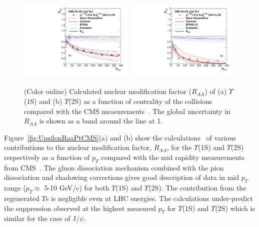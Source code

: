 {\begin{figure}
\includegraphics[width=0.49\textwidth]{Figures/Fig20l_CMS_Y1SRAANPart_Shade.pdf}
\includegraphics[width=0.49\textwidth]{Figures/Fig20r_CMS_Y2SRAANPart_Shade.pdf}
\caption{(Color online) Calculated nuclear modification factor ($R_{AA}$) \cite{Kumar:2019xdj} of 
  (a) $\Upsilon$(1S) and (b) $\Upsilon$(2S) as a function of centrality of the 
  collisions compared with the CMS measurements~\cite{Sirunyan:2018nsz}.%
  The global uncertainty in $R_{AA}$ is shown as a band around the line at 1.
}
\label{fig:UpsilonRaaNPartCMS}
\end{figure}


Figure~\ref{fig:UpsilonRaaPtCMS}(a) and (b) show the calculations~\cite{Kumar:2019xdj}
of various contributions to
the nuclear modification factor, $R_{AA}$, for the $\Upsilon$(1S) and $\Upsilon$(2S)
respectively as a function of $p_T$ compared with the mid rapidity measurements from
CMS~\cite{Sirunyan:2018nsz}.  
The gluon dissociation mechanism combined with the pion dissociation and shadowing
corrections gives good description of data in mid $p_{T}$ range ($p_{T}\approx$ 5-10 GeV/c)
for both $\Upsilon$(1S) and $\Upsilon$(2S).
The contribution from the regenerated $\Upsilon$s is negligible even at LHC energies.
The calculations under-predict the suppression observed at the highest measured
$p_{T}$ for $\Upsilon$(1S) and $\Upsilon$(2S) which is similar for the case
of J/$\psi$.

}
